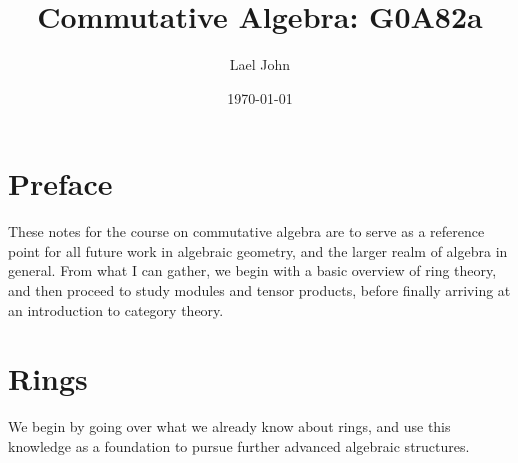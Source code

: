 \documentclass[12pt]{book}
\date{\today}
\title{Commutative Algebra: G0A82a}
\author{Lael John}
\theoremstyle{definition}
\begin{document}
\maketitle
\chapter*{Preface}
These notes for the course on commutative algebra are to serve as a reference point for all future work in algebraic geometry, and the larger realm of algebra in general. From what I can gather, we begin with a basic overview of ring theory, and then proceed to study modules and tensor products, before finally arriving at an introduction to category theory.
\tableofcontents
\chapter{Rings}
We begin by going over what we already know about rings, and use this knowledge as a foundation to pursue further advanced algebraic structures.
\end{document}
